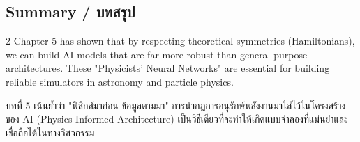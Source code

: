 \subsection{Summary \quad / \quad \textthai{บทสรุป}}
\begin{paracol}{2}
Chapter 5 has shown that by respecting theoretical symmetries (Hamiltonians), we can build AI models that are far more robust than general-purpose architectures. These "Physicists' Neural Networks" are essential for building reliable simulators in astronomy and particle physics.

\switchcolumn

\begin{thai}
บทที่ 5 เน้นย้ำว่า "ฟิสิกส์มาก่อน ข้อมูลตามมา" การนำกฎการอนุรักษ์พลังงานมาใส่ไว้ในโครงสร้างของ AI (Physics-Informed Architecture) เป็นวิธีเดียวที่จะทำให้เกิดแบบจำลองที่แม่นยำและเชื่อถือได้ในทางวิศวกรรม
\end{thai}
\end{paracol}
